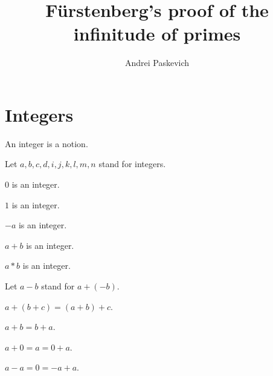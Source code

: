 \documentclass{document}
\title{Fürstenberg's proof of the infinitude of primes}
\author{Andrei Paskevich}
\date{}
\begin{document}

  \maketitle

  \section{Integers}

  \begin{forthel}

    \begin{signature}[Integers]
      An integer is a notion.
    \end{signature}

    Let $a,b,c,d,i,j,k,l,m,n$ stand for integers.

    \begin{signature}[IntZero]
      $0$ is an integer.
    \end{signature}

    \begin{signature}[IntOne]
      $1$ is an integer.
    \end{signature}

    \begin{signature}[IntNeg]
      $-a$ is an integer.
    \end{signature}

    \begin{signature}[IntPlus]
      $a + b$ is an integer.
    \end{signature}

    \begin{signature}[IntMult]
      $a * b$ is an integer.
    \end{signature}

    Let $a - b$ stand for $a + (-b)$.

    \begin{axiom}[AddAsso]
      $a + (b + c) = (a + b) + c$.
    \end{axiom}

    \begin{axiom}[AddComm]
      $a + b = b + a$.
    \end{axiom}

    \begin{axiom}[AddZero]
      $a + 0 = a = 0 + a$.
    \end{axiom}

    \begin{axiom}[AddNeg]
      $a - a = 0 = -a + a$.
    \end{axiom}


\end{forthel}
\end{document}
